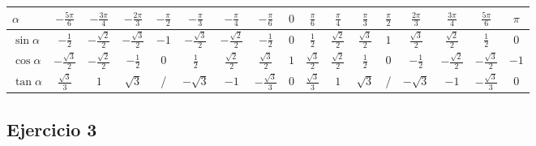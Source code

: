 \begin{enumerate}
  \begin{center}
  \begin{tabular}{| l | c | c | c | c | c | c | c | c | c | c | c | c | c | c | c | c |}
    \hline
    $\alpha$ &
    $-\frac{5\pi}{6}$ &
    $-\frac{3\pi}{4}$ &
    $-\frac{2\pi}{3}$ &
    $-\frac{\pi}{2}$ &
    $-\frac{\pi}{3}$ &
    $-\frac{\pi}{4}$ &
    $-\frac{\pi}{6}$ &
    $0$ &
    $\frac{\pi}{6}$ &
    $\frac{\pi}{4}$ &
    $\frac{\pi}{3}$ &
    $\frac{\pi}{2}$ &
    $\frac{2\pi}{3}$ &
    $\frac{3\pi}{4}$ &
    $\frac{5\pi}{6}$ &
    $\pi$ \\
    \hline
    $\sin \alpha$ & 
    $-\frac{1}{2}$ &
    $-\frac{\sqrt{2}}{2}$ &
    $-\frac{\sqrt{3}}{2}$ &
    $-1$ &
    $-\frac{\sqrt{3}}{2}$ &
    $-\frac{\sqrt{2}}{2}$ &
    $-\frac{1}{2}$ &
    $0$ &
    $\frac{1}{2}$ &
    $\frac{\sqrt{2}}{2}$ &
    $\frac{\sqrt{3}}{2}$ &
    $1$ &
    $\frac{\sqrt{3}}{2}$ &
    $\frac{\sqrt{2}}{2}$ &
    $\frac{1}{2}$ &
    $0$
    \\
    \hline
    $\cos \alpha$ &
    $-\frac{\sqrt{3}}{2}$ &
    $-\frac{\sqrt{2}}{2}$ &
    $-\frac{1}{2}$ &
    $0$ &
    $\frac{1}{2}$ &
    $\frac{\sqrt{2}}{2}$ &
    $\frac{\sqrt{3}}{2}$ &
    $1$ &
    $\frac{\sqrt{3}}{2}$ &
    $\frac{\sqrt{2}}{2}$ &
    $\frac{1}{2}$ &
    $0$ &
    $-\frac{1}{2}$ &
    $-\frac{\sqrt{2}}{2}$ &
    $-\frac{\sqrt{3}}{2}$ &
    $-1$
    \\
    \hline
    $\tan \alpha$ & 
    $\frac{\sqrt{3}}{3}$ &
    $1$ &
    $\sqrt{3}$ &
    / &
    $-\sqrt{3}$ &
    $-1$ &
    $-\frac{\sqrt{3}}{3}$ &
    $0$ &
    $\frac{\sqrt{3}}{3}$ &
    $1$ &
    $\sqrt{3}$ &
    / &
    $-\sqrt{3}$ &
    $-1$ &
    $-\frac{\sqrt{3}}{3}$ &
    $0$
    \\
    \hline
  \end{tabular}
  \end{center}
  
\end{enumerate}

\subsection{Ejercicio 3}

